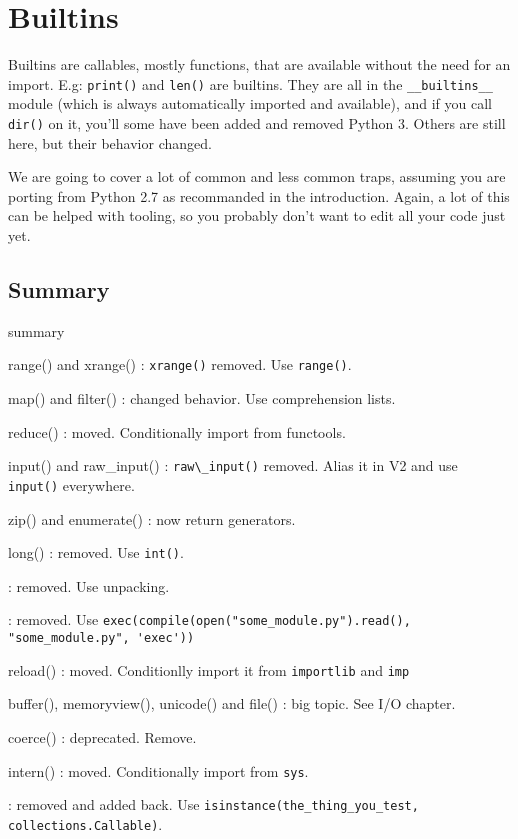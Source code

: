 
\chapter{Builtins}

Builtins are \glspl{callable}, mostly functions, that are available without the need for an import. E.g: \lstinline{print()} and \lstinline{len()} are builtins. They are all in the \lstinline{__builtins__} module (which is always automatically imported and available), and if you call \lstinline{dir()} on it, you'll some have been added and removed Python 3. Others are still here, but their behavior changed.

We are going to cover a lot of common and less common traps, assuming you are porting from Python 2.7 as recommanded in the introduction. Again, a lot of this can be helped with tooling, so you probably don't want to edit all your code just yet.

\section{Summary}

\begin{labeling}{summary}
\item [range() and xrange()]: \lstinline{xrange()} removed. Use \lstinline{range()}.
\item [map() and filter()]: changed behavior. Use comprehension lists.
\item [reduce()]: moved. Conditionally import from functools.
\item [input() and raw\_input()]: \lstinline{raw\_input()} removed. Alias it in V2 and use \lstinline{input()} everywhere.
\item [zip() and enumerate()]: now return generators.
\item [long()]: removed. Use \lstinline{int()}.
\item [apply()]: removed. Use unpacking.
\item [execfile()]: removed. Use \lstinline{exec(compile(open("some_module.py").read(), "some_module.py", 'exec'))}
\item [reload()]: moved. Conditionlly import it from \lstinline{importlib} and \lstinline{imp}
\item [buffer(), memoryview(), unicode() and file()]: big topic. See I/O chapter.
\item [coerce()]: deprecated. Remove.
\item [intern()]: moved. Conditionally import from \lstinline{sys}.
\item [callable()]: removed and added back. Use \lstinline{isinstance(the_thing_you_test, collections.Callable)}.
\end{labeling}

